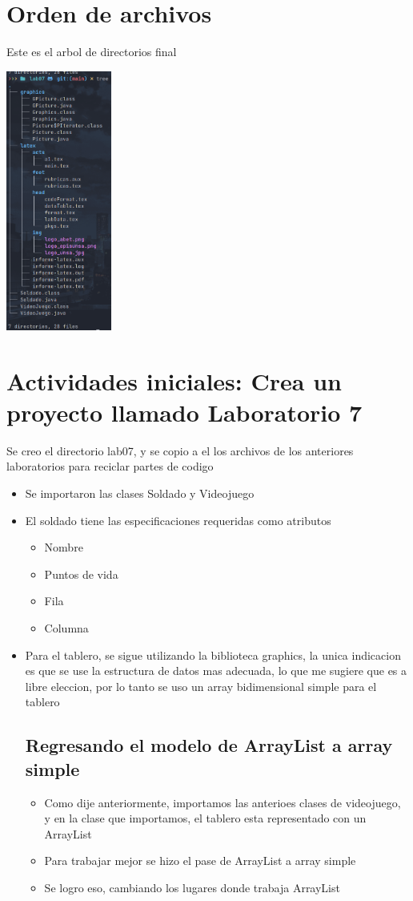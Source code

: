 \section{Orden de archivos}
Este es el arbol de directorios final

\includegraphics [width=0.26\textwidth] {img/tree.jpg}


\section{Actividades iniciales: Crea un proyecto llamado Laboratorio 7}
Se creo el directorio lab07, y se copio a el los archivos de los anteriores laboratorios para reciclar partes de codigo

\begin{itemize}
  \item Se importaron las clases Soldado y Videojuego
  \item El soldado tiene las especificaciones requeridas como atributos
  \begin{itemize}
    \item Nombre
    \item Puntos de vida
    \item Fila
    \item Columna
  \end{itemize}
  \item Para el tablero, se sigue utilizando la biblioteca graphics, la unica indicacion es que se use la estructura de datos mas adecuada, lo que me sugiere que es a libre eleccion, por lo tanto se uso un array bidimensional simple para el tablero

  \subsection{Regresando el modelo de ArrayList a array simple}
  \begin{itemize}
    \item Como dije anteriormente, importamos las anterioes clases de videojuego, y en la clase que importamos, el tablero esta representado con un ArrayList
    \item Para trabajar mejor se hizo el pase de ArrayList a array simple
    \item Se logro eso, cambiando los lugares donde trabaja ArrayList
  \end{itemize}

\end{itemize}
